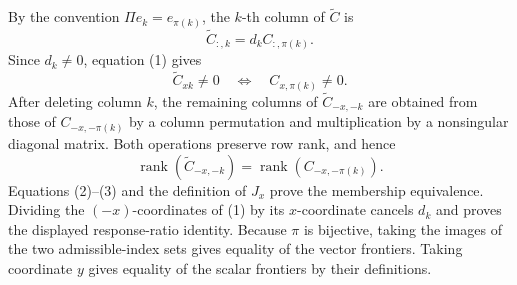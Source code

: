 By the convention \(\Pi e_k=e_{\pi(k)}\), the \(k\)-th column of \(\widetilde C\) is
\[
 \widetilde C_{:,k}=d_k C_{:,\pi(k)}. \tag{1}
\]
Since \(d_k\ne0\), equation (1) gives
\[
 \widetilde C_{xk}\ne0
 \quad\Longleftrightarrow\quad
 C_{x,\pi(k)}\ne0. \tag{2}
\]
After deleting column \(k\), the remaining columns of \(\widetilde C_{-x,-k}\) are obtained from those of \(C_{-x,-\pi(k)}\) by a column permutation and multiplication by a nonsingular diagonal matrix. Both operations preserve row rank, and hence
\[
 \operatorname{rank}(\widetilde C_{-x,-k})
 =\operatorname{rank}(C_{-x,-\pi(k)}). \tag{3}
\]
Equations (2)--(3) and the definition of \(J_x\) prove the membership equivalence. Dividing the \((-x)\)-coordinates of (1) by its \(x\)-coordinate cancels \(d_k\) and proves the displayed response-ratio identity. Because \(\pi\) is bijective, taking the images of the two admissible-index sets gives equality of the vector frontiers. Taking coordinate \(y\) gives equality of the scalar frontiers by their definitions.